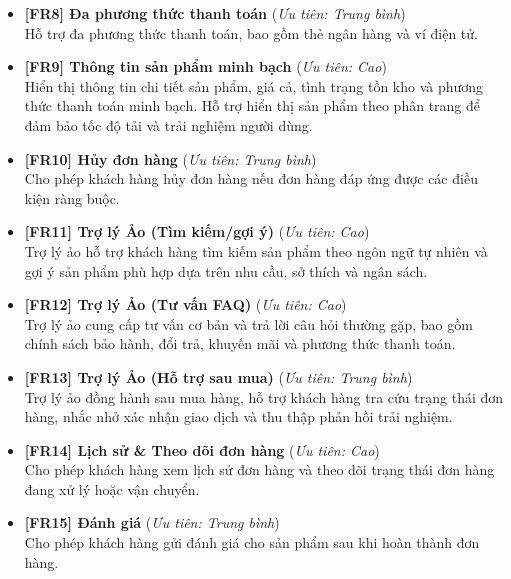 \begin{itemize}
\item \textbf{[FR8] Đa phương thức thanh toán} \quad (\textit{Ưu tiên: Trung bình})\\
    Hỗ trợ đa phương thức thanh toán, bao gồm thẻ ngân hàng và ví điện tử.

\item \textbf{[FR9] Thông tin sản phẩm minh bạch} \quad (\textit{Ưu tiên: Cao})\\
    Hiển thị thông tin chi tiết sản phẩm, giá cả, tình trạng tồn kho và phương thức thanh toán minh bạch.
    Hỗ trợ hiển thị sản phẩm theo phân trang để đảm bảo tốc độ tải và trải nghiệm người dùng.

\item \textbf{[FR10] Hủy đơn hàng} \quad (\textit{Ưu tiên: Trung bình})\\
    Cho phép khách hàng hủy đơn hàng nếu đơn hàng đáp ứng được các điều kiện ràng buộc.

\item \textbf{[FR11] Trợ lý Ảo (Tìm kiếm/gợi ý)} \quad (\textit{Ưu tiên: Cao})\\
    Trợ lý ảo hỗ trợ khách hàng tìm kiếm sản phẩm theo ngôn ngữ tự nhiên và gợi ý sản phẩm phù hợp dựa trên nhu cầu, sở thích và ngân sách.

\item \textbf{[FR12] Trợ lý Ảo (Tư vấn FAQ)} \quad (\textit{Ưu tiên: Cao})\\
    Trợ lý ảo cung cấp tư vấn cơ bản và trả lời câu hỏi thường gặp, bao gồm chính sách bảo hành, đổi trả, khuyến mãi và phương thức thanh toán.

\item \textbf{[FR13] Trợ lý Ảo (Hỗ trợ sau mua)} \quad (\textit{Ưu tiên: Trung bình})\\
    Trợ lý ảo đồng hành sau mua hàng, hỗ trợ khách hàng tra cứu trạng thái đơn hàng, nhắc nhở xác nhận giao dịch và thu thập phản hồi trải nghiệm.

\item \textbf{[FR14] Lịch sử \& Theo dõi đơn hàng} \quad (\textit{Ưu tiên: Cao})\\
    Cho phép khách hàng xem lịch sử đơn hàng và theo dõi trạng thái đơn hàng đang xử lý hoặc vận chuyển.

\item \textbf{[FR15] Đánh giá} \quad (\textit{Ưu tiên: Trung bình})\\
    Cho phép khách hàng gửi đánh giá cho sản phẩm sau khi hoàn thành đơn hàng.

\end{itemize}

